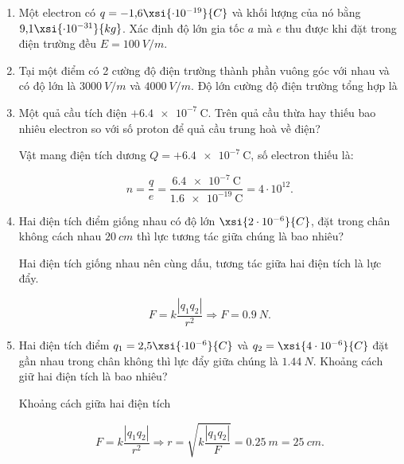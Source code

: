 \begin{enumerate}[label=\bfseries Câu \arabic*:]
	\item {}
	
	{
		Một electron có $q = -\text{1,6}\xsi{\cdot 10^{-19}}{C}$ và khối lượng của nó bằng $\text{9,1}\xsi{\cdot 10^{-31}}{kg}$. Xác định độ lớn gia tốc $a$ mà $e$ thu được khi đặt trong điện trường đều $E = \SI{100}{V/m}$.
	}
	
	
	\item {}
	
	{
	
	Tại một điểm có 2 cường độ điện trường thành phần vuông góc với nhau và có độ lớn là $\SI{3000}{V/m}$ và $\SI{4000}{V/m}$. Độ lớn cường độ điện trường tổng hợp là 
}
	
	\item {}
	
	
	{
		Một quả cầu tích điện $+\SI{6.4e-7}{\coulomb}$. Trên quả cầu thừa hay thiếu bao nhiêu electron so với số proton để quả cầu trung hoà về điện?
		
	}
	
	\hideall
	{
		Vật mang điện tích dương $Q=+\SI{6.4e-7}{\coulomb}$, số electron thiếu là:
		
		$$n=\dfrac{q}{e}=\dfrac{\SI{6.4e-7}{\coulomb}}{\SI{1.6e-19}{\coulomb}}=4\cdot 10^{12}.$$
		
	}
	\item {}
	
	
	{
		Hai điện tích điểm giống nhau có độ lớn $\xsi{2\cdot 10^{-6}}{C}$, đặt trong chân không cách nhau $\SI{20}{cm}$ thì lực tương tác giữa chúng là bao nhiêu?
		
	}
	
	\hideall
	{
		Hai điện tích giống nhau nên cùng dấu, tương tác giữa hai điện tích là lực đẩy.
		
		$$F = k \dfrac{|q_1q_2|}{r^2} \Rightarrow F = \SI{0,9}{N}.$$
		
	}
	\item {}
	
	
	{
		
		Hai điện tích điểm $q_1=\text{2,5}\xsi{\cdot 10^{-6}}{C}$ và $q_2=\xsi{4\cdot 10^{-6}}{C}$ đặt gần nhau trong chân không thì lực đẩy giữa chúng là $\SI{1,44}{N}$. Khoảng cách giữ hai điện tích là bao nhiêu?
	}
	
	\hideall
	{
	Khoảng cách giữa hai điện tích 
	
	$$F = k \dfrac{|q_1q_2|}{r^2} \Rightarrow r = \sqrt{k \dfrac{|q_1q_2|}{F}} = \SI{0,25}{m} = \SI{25}{cm}.$$
	}
\end{enumerate}